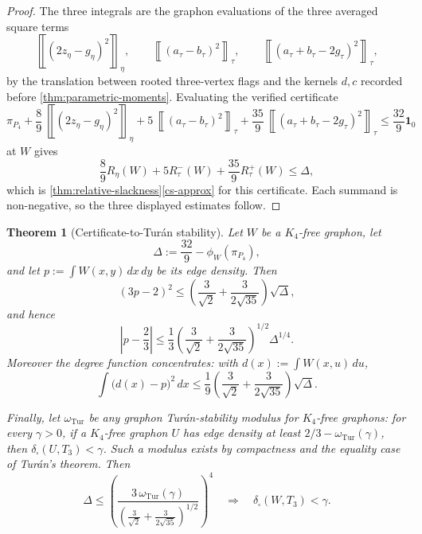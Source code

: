 \documentclass[11pt]{article}
\newtheorem{theorem}{Theorem}
\theoremstyle{definition}
\newcommand{\avg}[2]{\left\llbracket #1 \right\rrbracket_{#2}}
\newcommand{\one}{\mathbf 1}
\begin{document}
\begin{proof}
The three integrals are the graphon evaluations of the three averaged square terms
\[
  \avg{(2z_\eta-g_\eta)^2}{\eta},\qquad
  \avg{(a_\tau-b_\tau)^2}{\tau},\qquad
  \avg{(a_\tau+b_\tau-2g_\tau)^2}{\tau},
\]
by the translation between rooted three-vertex flags and the kernels $d,c$ recorded
before \cref{thm:parametric-moments}.  Evaluating the verified certificate
\[
  \pi_{P_4}
  +\frac89\,\avg{(2z_\eta-g_\eta)^2}{\eta}
  +5\,\avg{(a_\tau-b_\tau)^2}{\tau}
  +\frac{35}{9}\,\avg{(a_\tau+b_\tau-2g_\tau)^2}{\tau}
  \le \frac{32}{9}\one_0
\]
at $W$ gives
\[
  \frac89 R_\eta(W)+5R_\tau^{-}(W)+\frac{35}{9}R_\tau^{+}(W)\le\Delta ,
\]
which is \cref{thm:relative-slackness}\ref{cs-approx} for this certificate.  Each
summand is non-negative, so the three displayed estimates follow.
\end{proof}

\begin{theorem}[Certificate-to-Tur\'an stability]\label{thm:k4free-p4-quant-stability}
Let $W$ be a $K_4$-free graphon, let
\[
  \Delta:=\frac{32}{9}-\phi_W(\pi_{P_4}),
\]
and let $p:=\int W(x,y)\,dx\,dy$ be its edge density.  Then
\[
  (3p-2)^2
  \le
  \left(\frac{3}{\sqrt2}+\frac{3}{2\sqrt{35}}\right)\sqrt{\Delta},
\]
and hence
\[
  \left|p-\frac23\right|
  \le
  \frac13
  \left(\frac{3}{\sqrt2}+\frac{3}{2\sqrt{35}}\right)^{1/2}
  \Delta^{1/4}.
\]
Moreover the degree function concentrates: with $d(x):=\int W(x,u)\,du$,
\[
  \int\bigl(d(x)-p\bigr)^2\,dx
  \le
  \frac19\left(\frac{3}{\sqrt2}+\frac{3}{2\sqrt{35}}\right)\sqrt{\Delta}.
\]

Finally, let $\omega_{\mathrm{Tur}}$ be any graphon Tur\'an-stability modulus for
$K_4$-free graphons: for every $\gamma>0$, if a $K_4$-free graphon $U$ has edge
density at least $2/3-\omega_{\mathrm{Tur}}(\gamma)$, then
$\delta_\square(U,T_3)<\gamma$.  Such a modulus exists by compactness and the equality
case of Tur\'an's theorem.  Then
\[
  \Delta
  \le
  \left(
    \frac{3\,\omega_{\mathrm{Tur}}(\gamma)}
    {\left(\frac{3}{\sqrt2}+\frac{3}{2\sqrt{35}}\right)^{1/2}}
  \right)^4
  \quad\Longrightarrow\quad
  \delta_\square(W,T_3)<\gamma .
\]
\end{theorem}
\end{document}
